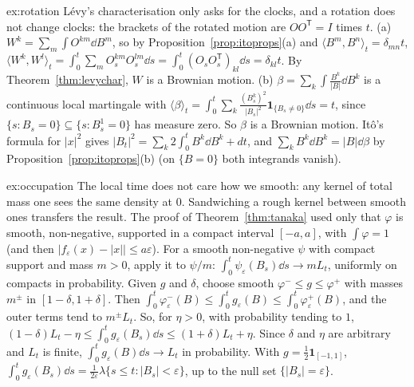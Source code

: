\begin{solution}{ex:rotation}
\idea L\'evy's characterisation only asks for the clocks, and a rotation does not change clocks: the brackets of the rotated motion are $OO^{\mathsf T}=I$ times $t$.
\writeup (a) $W^k=\sum_m\int O^{km}\dd B^m$, so by Proposition~\ref{prop:itoprops}(a) and $\langle B^m,B^n\rangle_t=\delta_{mn}t$, $\langle W^k,W^l\rangle_t=\int_0^t\sum_mO^{km}_sO^{lm}_s\dd s=\int_0^t(O_sO_s^{\mathsf T})_{kl}\dd s=\delta_{kl}t$.
By Theorem~\ref{thm:levychar}, $W$ is a Brownian motion. (b) $\beta=\sum_k\int\frac{B^k}{|B|}\dd B^k$ is a continuous local martingale with $\langle\beta\rangle_t=\int_0^t\sum_k\frac{(B^k_s)^2}{|B_s|^2}\mathbf 1_{\{B_s\ne0\}}\dd s=t$, since
$\{s:B_s=0\}\subseteq\{s:B^1_s=0\}$ has measure zero. So $\beta$ is a Brownian motion. It\^o's formula for $|x|^2$ gives $|B_t|^2=\sum_k2\int_0^tB^k\dd B^k+dt$, and $\sum_kB^k\dd B^k=|B|\dd\beta$ by
Proposition~\ref{prop:itoprops}(b) (on $\{B=0\}$ both integrands vanish).
\end{solution}

\begin{solution}{ex:occupation}
\idea The local time does not care how we smooth: any kernel of total mass one sees the same density at $0$. Sandwiching a rough kernel between smooth ones transfers the result.
\writeup The proof of Theorem~\ref{thm:tanaka} used only that $\varphi$ is smooth, non-negative, supported in a compact interval $[-a,a]$, with $\int\varphi=1$ (and then $|f_\varepsilon(x)-|x||\le a\varepsilon$). For a smooth non-negative $\psi$
with compact support and mass $m>0$, apply it to $\psi/m$: $\int_0^t\psi_\varepsilon(B_s)\dd s\to mL_t$, uniformly on compacts in probability. Given $g$ and $\delta$, choose smooth $\varphi^-\le g\le\varphi^+$ with masses $m^\pm$ in
$[1-\delta,1+\delta]$. Then $\int_0^t\varphi^-_\varepsilon(B)\le\int_0^tg_\varepsilon(B)\le\int_0^t\varphi^+_\varepsilon(B)$, and the outer terms tend to $m^\pm L_t$. So, for $\eta>0$, with probability tending to $1$,
$(1-\delta)L_t-\eta\le\int_0^tg_\varepsilon(B_s)\dd s\le(1+\delta)L_t+\eta$. Since $\delta$ and $\eta$ are arbitrary and $L_t$ is finite, $\int_0^tg_\varepsilon(B)\dd s\to L_t$ in probability. With $g=\frac12\mathbf 1_{[-1,1]}$,
$\int_0^tg_\varepsilon(B_s)\dd s=\frac1{2\varepsilon}\lambda\{s\le t:|B_s|<\varepsilon\}$, up to the null set $\{|B_s|=\varepsilon\}$.
\end{solution}

